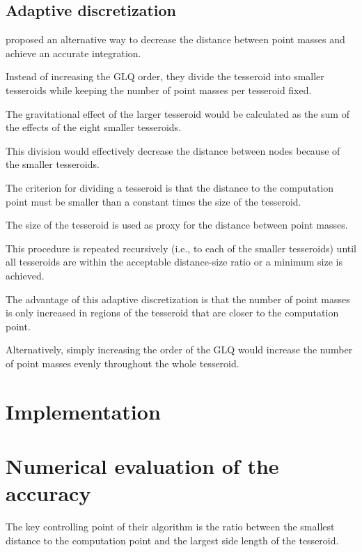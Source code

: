 \documentclass[paper,twocolumn]{geophysics}
\begin{document}
\subsection{Adaptive discretization}


\citet{Li2011} proposed an alternative way to decrease the distance between
point masses and achieve an accurate integration.

Instead of increasing the GLQ order,
they divide the tesseroid into smaller tesseroids while keeping the number of
point masses per tesseroid fixed.

The gravitational effect of the larger tesseroid would be calculated as the sum
of the effects of the eight smaller tesseroids.

This division would effectively decrease the distance between nodes because of
the smaller tesseroids.

The criterion for dividing a tesseroid is that
the distance to the computation point must be smaller than
a constant times the size of the tesseroid.

The size of the tesseroid is used as proxy for the distance between point
masses.

This procedure is repeated recursively
(i.e., to each of the smaller tesseroids)
until all tesseroids are within the acceptable distance-size ratio
or a minimum size is achieved.


The advantage of this adaptive discretization is that the number of point
masses is only increased in regions of the tesseroid that are closer to the
computation point.

Alternatively, simply increasing the order of the GLQ would increase the number
of point masses evenly throughout the whole tesseroid.


\section{Implementation}


\section{Numerical evaluation of the accuracy}

The key controlling point of their algorithm is the ratio between
the smallest distance to the computation point and
the largest side length of the tesseroid.
\end{document}
